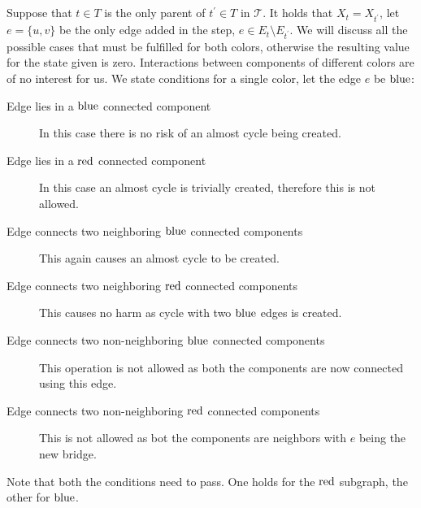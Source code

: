 \subsection{\IntroduceEdgeNode}

Suppose that \( t \in T \) is
the only parent of \( t^\prime \in T \) in \( \mathcal {T} \).
It holds that \( X_t = X_{t^\prime} \),
let \( e = \{u, v\} \) be the only edge added in the step, \( e \in E_t \setminus E_{t^\prime} \).
We will discuss all the possible cases that must be fulfilled for both colors,
otherwise the resulting value for the state given is zero.
Interactions between components of different colors are of no interest for us.
We state conditions for a single color, \WLOG{} let the edge \( e \) be \( \text{blue} \):
%
\begin{description}
	\item[Edge lies in a \( \text{blue} \) connected component]
	      In this case there is no risk of an almost cycle being created.
	\item[Edge lies in a \( \text{red} \) connected component]
	      In this case an almost cycle is trivially created,
	      therefore this is not allowed.
	\item[Edge connects two neighboring \( \text{blue} \) connected components]
	      This again causes an almost cycle to be created.
	\item[Edge connects two neighboring \( \text{red} \) connected components]
	      This causes no harm as cycle with two \( \text{blue} \) edges is created.
	\item[Edge connects two non-neighboring \( \text{blue} \) connected components]
	      This operation is not allowed as both the components
	      are now connected using this edge.
	\item[Edge connects two non-neighboring \( \text{red} \) connected components]
	      This is not allowed as bot the components
	      are neighbors with \( e \) being the new bridge.
\end{description}
%
Note that both the conditions need to pass.
One holds for the \( \text{red} \) subgraph, the other for \( \text{blue} \).

